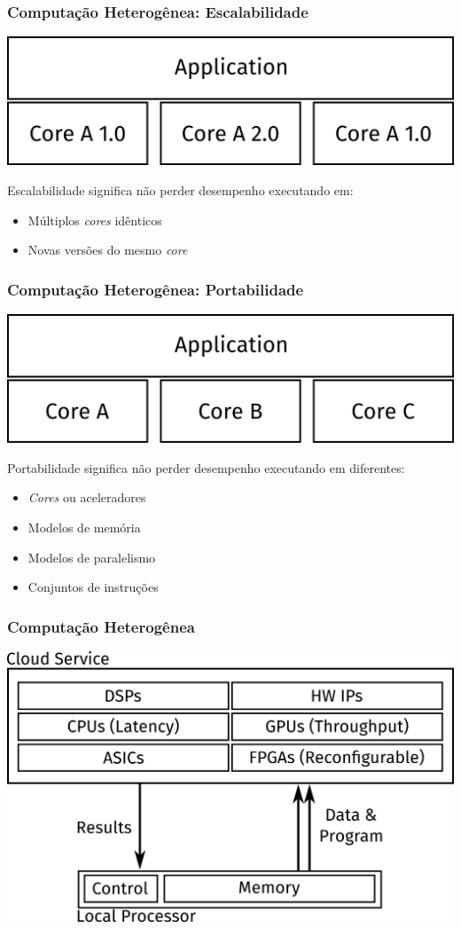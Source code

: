 \documentclass[10pt, compress]{beamer}
\begin{document}
\begin{frame}
    \frametitle{Computação Heterogênea: Escalabilidade}
    \begin{center}
        \includegraphics[width=.7\textwidth]{scalability}
    \end{center}

    \alert{Escalabilidade} significa não perder desempenho
        executando em:
    \begin{itemize}
        \item Múltiplos \textit{cores} idênticos
            \pause
        \item Novas versões do mesmo \textit{core}
    \end{itemize}
\end{frame}

\begin{frame}
    \frametitle{Computação Heterogênea: Portabilidade}
    \begin{center}
        \includegraphics[width=.7\textwidth]{portability}
    \end{center}

    \alert{Portabilidade} significa não perder desempenho
        executando em diferentes:
    \begin{itemize}
        \item \textit{Cores} ou \alert{aceleradores}
            \pause
        \item Modelos de memória
            \pause
        \item Modelos de paralelismo
            \pause
        \item Conjuntos de instruções
    \end{itemize}
\end{frame}

\begin{frame}
    \frametitle{Computação Heterogênea}
    \centering
    \includegraphics[width=.85\textwidth]{heterogeneous}
\end{frame}
\end{document}
